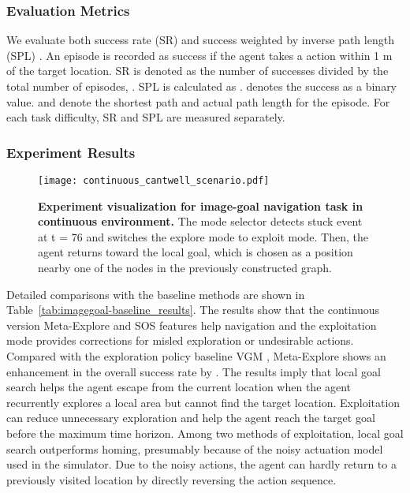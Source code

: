 \documentclass[10pt,twocolumn,letterpaper]{article}
\begin{document}
\subsubsection{Evaluation Metrics}
We evaluate both success rate ({SR}) and success weighted by inverse path length ({SPL}) \cite{anderson2018evaluation}. An episode is recorded as success if the agent takes a  action within 1 m of the target location. {SR} is denoted as the number of successes divided by the total number of episodes, . {SPL} is calculated as .  denotes the success as a binary value.  and  denote the shortest path and actual path length for the  episode. For each task difficulty, {SR} and {SPL} are measured separately.
\subsubsection{Experiment Results}
\begin{figure*}[t!]{\centering\texttt{[image: continuous\_cantwell\_scenario.pdf]}}\centering
\caption{{\textbf{Experiment visualization for image-goal navigation task in continuous environment.} The mode selector detects stuck event at t = 76 and switches the explore mode to exploit mode. Then, the agent returns toward the local goal, which is chosen as a position nearby one of the nodes in the previously constructed graph.
}}\label{fig:continuous-cantwell-scenario}
\end{figure*}

Detailed comparisons with the baseline methods are shown in Table~\ref{tab:imagegoal-baseline_results}. The results show that the continuous version Meta-Explore and SOS features help navigation and the exploitation mode provides corrections for misled exploration or undesirable actions. Compared with the exploration policy baseline VGM \cite{vgm}, Meta-Explore shows an enhancement in the overall success rate by . The results imply that local goal search helps the agent escape from the current location when the agent recurrently explores a local area but cannot find the target location. Exploitation can reduce unnecessary exploration and help the agent reach the target goal before the maximum time horizon. Among two methods of exploitation, local goal search outperforms homing, presumably because of the noisy actuation model used in the simulator. Due to the noisy actions, the agent can hardly return to a previously visited location by directly reversing the action sequence.
\end{document}
